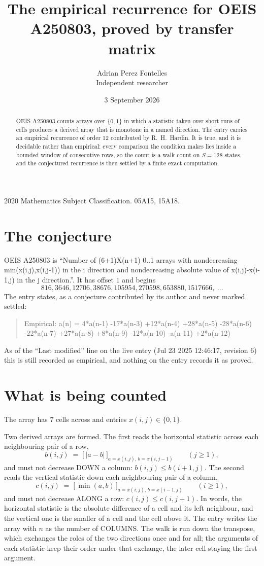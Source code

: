 \documentclass[11pt,a4paper]{article}
\title{The empirical recurrence for OEIS A250803, proved by transfer matrix}
\author{Adrian Perez Fontelles\\ \small Independent researcher}
\date{3 September 2026}
\theoremstyle{plain}
\theoremstyle{definition}
\begin{document}
\maketitle

\begin{abstract}
OEIS A250803 counts arrays over $\{0,1\}$ in which a statistic taken over short runs
of cells produces a derived array that is monotone in a named direction. The entry carries an
empirical recurrence of order $12$ contributed by R.~H.~Hardin. It is true, and it is
decidable rather than empirical: every comparison the condition makes lies inside a bounded
window of consecutive rows, so the count is a walk count on $S=128$ states, and the
conjectured recurrence is then settled by a finite exact computation.
\end{abstract}

\noindent\small 2020 Mathematics Subject Classification. 05A15, 15A18.\normalsize

\section{The conjecture}

OEIS A250803 is ``Number of (6+1)X(n+1) 0..1 arrays with nondecreasing min(x(i,j),x(i,j-1)) in the i direction and nondecreasing absolute value of x(i,j)-x(i-1,j) in the j direction.''. It has offset $1$ and begins
\[
816, 3646, 12706, 38676, 105954, 270598, 653880, 1517666,\ \dots
\]
The entry states, as a conjecture contributed by its author and never marked settled:
\begin{quote}
Empirical: a(n) = 4*a(n-1) -17*a(n-3) +12*a(n-4) +28*a(n-5) -28*a(n-6) -22*a(n-7) +27*a(n-8) +8*a(n-9) -12*a(n-10) -a(n-11) +2*a(n-12)
\end{quote}
As of the ``Last modified'' line on the live entry (Jul 23 2025 12:46:17, revision 6) this is still
recorded as empirical, and nothing on the entry records it as proved.

\section{What is being counted}

The array has $7$ cells across and entries $x(i,j)\in\{0,1\}$.

Two derived arrays are formed. The first reads the horizontal statistic across each
neighbouring pair of a row,
\[
b(i,j)\;=\;\bigl[\,\lvert a-b\rvert\,\bigr]_{a=x(i,j),\,b=x(i,j-1)}\qquad (j\ge1),
\]
and must not decrease DOWN a column: $b(i,j)\le b(i{+}1,j)$. The second reads the vertical
statistic down each neighbouring pair of a column,
\[
c(i,j)\;=\;\bigl[\,\min(a,b)\,\bigr]_{a=x(i,j),\,b=x(i{-}1,j)}\qquad (i\ge1),
\]
and must not decrease ALONG a row: $c(i,j)\le c(i,j{+}1)$. In words, the horizontal statistic
is the absolute difference of a cell and its left neighbour, and the vertical one is
the smaller of a cell and the cell above it. The entry writes the array with $n$ as the number of COLUMNS. The walk is run down the transpose, which exchanges the roles of the two directions once and for all; the arguments of each statistic keep their order under that exchange, the later cell staying the first argument.
\end{document}
